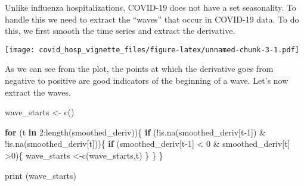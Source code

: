 \documentclass[
]{article}
\newenvironment{Shaded}{\begin{snugshade}}{\end{snugshade}}
\newcommand{\AttributeTok}[1]{\textcolor[rgb]{0.77,0.63,0.00}{#1}}
\newcommand{\ControlFlowTok}[1]{\textcolor[rgb]{0.13,0.29,0.53}{\textbf{#1}}}
\newcommand{\DecValTok}[1]{\textcolor[rgb]{0.00,0.00,0.81}{#1}}
\newcommand{\FunctionTok}[1]{\textcolor[rgb]{0.00,0.00,0.00}{#1}}
\newcommand{\NormalTok}[1]{#1}
\newcommand{\OtherTok}[1]{\textcolor[rgb]{0.56,0.35,0.01}{#1}}
\newcommand{\SpecialCharTok}[1]{\textcolor[rgb]{0.00,0.00,0.00}{#1}}
\newcommand{\StringTok}[1]{\textcolor[rgb]{0.31,0.60,0.02}{#1}}
\begin{document}
Unlike influenza hospitalizations, COVID-19 does not have a set
seasonality. To handle this we need to extract the ``waves'' that occur
in COVID-19 data. To do this, we first smooth the time series and
extract the derivative.

\begin{Shaded}
\end{Shaded}

\texttt{[image: covid\_hosp\_vignette\_files/figure-latex/unnamed-chunk-3-1.pdf]}

As we can see from the plot, the points at which the derivative goes
from negative to positive are good indicators of the beginning of a
wave. Let's now extract the waves.

\begin{Shaded}
\begin{Highlighting}[]
\NormalTok{wave\_starts }\OtherTok{\textless{}{-}} \FunctionTok{c}\NormalTok{()}

\ControlFlowTok{for}\NormalTok{ (t }\ControlFlowTok{in} \DecValTok{2}\SpecialCharTok{:}\FunctionTok{length}\NormalTok{(smoothed\_deriv))\{}
  \ControlFlowTok{if}\NormalTok{ (}\SpecialCharTok{!}\FunctionTok{is.na}\NormalTok{(smoothed\_deriv[t}\DecValTok{{-}1}\NormalTok{]) }\SpecialCharTok{\&} \SpecialCharTok{!}\FunctionTok{is.na}\NormalTok{(smoothed\_deriv[t]))\{}
    \ControlFlowTok{if}\NormalTok{ (smoothed\_deriv[t}\DecValTok{{-}1}\NormalTok{] }\SpecialCharTok{\textless{}} \DecValTok{0} \SpecialCharTok{\&}\NormalTok{ smoothed\_deriv[t] }\SpecialCharTok{\textgreater{}}\DecValTok{0}\NormalTok{)\{}
\NormalTok{      wave\_starts }\OtherTok{\textless{}{-}}\FunctionTok{c}\NormalTok{(wave\_starts,t)}
\NormalTok{    \}}
\NormalTok{  \}}
\NormalTok{\}}

\FunctionTok{print}\NormalTok{ (wave\_starts)}
\end{Highlighting}
\end{Shaded}
\end{document}
